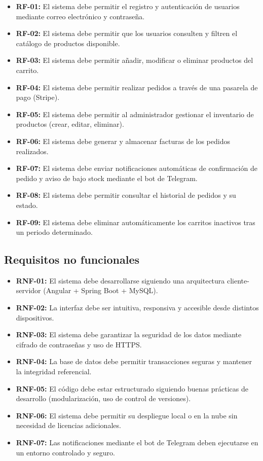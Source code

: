 \begin{itemize}
    \item \textbf{RF-01:} El sistema debe permitir el registro y autenticación de usuarios mediante correo electrónico y contraseña.
    \item \textbf{RF-02:} El sistema debe permitir que los usuarios consulten y filtren el catálogo de productos disponible.
    \item \textbf{RF-03:} El sistema debe permitir añadir, modificar o eliminar productos del carrito.
    \item \textbf{RF-04:} El sistema debe permitir realizar pedidos a través de una pasarela de pago (Stripe).
    \item \textbf{RF-05:} El sistema debe permitir al administrador gestionar el inventario de productos (crear, editar, eliminar).
    \item \textbf{RF-06:} El sistema debe generar y almacenar facturas de los pedidos realizados.
    \item \textbf{RF-07:} El sistema debe enviar notificaciones automáticas de confirmación de pedido y aviso de bajo stock mediante el bot de Telegram.
    \item \textbf{RF-08:} El sistema debe permitir consultar el historial de pedidos y su estado.
    \item \textbf{RF-09:} El sistema debe eliminar automáticamente los carritos inactivos tras un periodo determinado.
\end{itemize}

\subsection{Requisitos no funcionales}

\begin{itemize}
    \item \textbf{RNF-01:} El sistema debe desarrollarse siguiendo una arquitectura cliente-servidor (Angular + Spring Boot + MySQL).
    \item \textbf{RNF-02:} La interfaz debe ser intuitiva, responsiva y accesible desde distintos dispositivos.
    \item \textbf{RNF-03:} El sistema debe garantizar la seguridad de los datos mediante cifrado de contraseñas y uso de HTTPS.
    \item \textbf{RNF-04:} La base de datos debe permitir transacciones seguras y mantener la integridad referencial.
    \item \textbf{RNF-05:} El código debe estar estructurado siguiendo buenas prácticas de desarrollo (modularización, uso de control de versiones).
    \item \textbf{RNF-06:} El sistema debe permitir su despliegue local o en la nube sin necesidad de licencias adicionales.
    \item \textbf{RNF-07:} Las notificaciones mediante el bot de Telegram deben ejecutarse en un entorno controlado y seguro.
\end{itemize}

